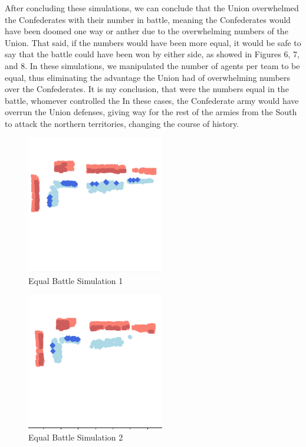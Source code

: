 \documentclass[final,5p,times,twocolumn,authoryear]{elsarticle}
\begin{document}
After concluding these simulations, we can conclude that the Union overwhelmed the Confederates with their number in battle, meaning the Confederates would have been doomed one way or anther due to the overwhelming numbers of the Union. That said, if the numbers would have been more equal, it would be safe to say that the battle could have been won by either side, as showed in Figures 6, 7, and 8. In these simulations, we manipulated the number of agents per team to be equal, thus eliminating the advantage the Union had of overwhelming numbers over the Confederates. It is my conclusion, that were the numbers equal in the battle, whomever controlled the 
In these cases, the Confederate army would have overrun the Union defenses, giving way for the rest of the armies from the South to attack the northern territories, changing the course of history.

\begin{figure}[!ht]
  \centering
      \includegraphics[width=6cm]{Equal_Battle.png}
      \caption{Equal Battle Simulation 1}
      \label{fig:Simulation}
  \centering
\end{figure}

\begin{figure}[!ht]
  \centering
      \includegraphics[width=6cm]{Equal_battle_2.png}
      \caption{Equal Battle Simulation 2}
      \label{fig:Simulation}
  \centering
\end{figure}
\end{document}
